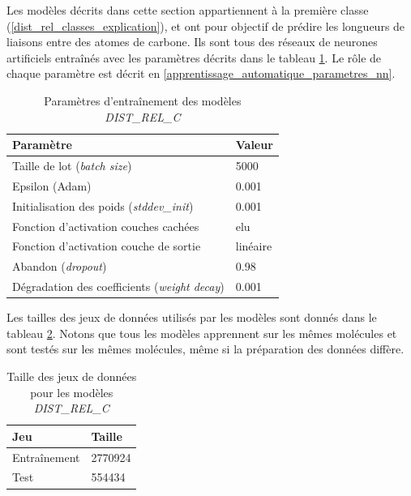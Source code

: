 \label{dist_rel_classe1}

\par Les modèles décrits dans cette section appartiennent à la première classe (\ref{dist_rel_classes_explication}), et ont pour objectif de prédire les longueurs de liaisons entre des atomes de carbone. Ils sont tous des réseaux de neurones artificiels entraînés avec les paramètres décrits dans le tableau \ref{table_params_dist_rel_c}. Le rôle de chaque paramètre est décrit en \ref{apprentissage_automatique_parametres_nn}.

\begin{table}
	\centering
	\begin{tabular}{|l|l|}
		\hline
		\textbf{Paramètre} & \textbf{Valeur} \\ \hline
		Taille de lot (\emph{batch size}) & 5000 \\ \hline
		Epsilon (Adam) & 0.001 \\ \hline
		Initialisation des poids (\emph{stddev\_init}) & 0.001 \\ \hline
		Fonction d'activation couches cachées & elu \\ \hline
		Fonction d'activation couche de sortie & linéaire \\ \hline
		Abandon (\emph{dropout}) & 0.98 \\ \hline
		Dégradation des coefficients (\emph{weight decay}) & 0.001 \\ \hline

	\end{tabular}

	\caption{Paramètres d'entraînement des modèles \emph{DIST\_REL\_C}}
	\label{table_params_dist_rel_c}

\end{table}

\par Les tailles des jeux de données utilisés par les modèles sont donnés dans le tableau \ref{table_tailles_data_dist_rel_c}. Notons que tous les modèles apprennent sur les mêmes molécules et sont testés sur les mêmes molécules, même si la préparation des données diffère.

\begin{table}
	\centering
	\begin{tabular}{|l|l|}
		\hline
		\textbf{Jeu} & \textbf{Taille} \\ \hline
		Entraînement & 2770924 \\ \hline
		Test & 554434 \\ \hline
	\end{tabular}
	\caption{Taille des jeux de données pour les modèles \emph{DIST\_REL\_C}}	
	\label{table_tailles_data_dist_rel_c}
\end{table}




